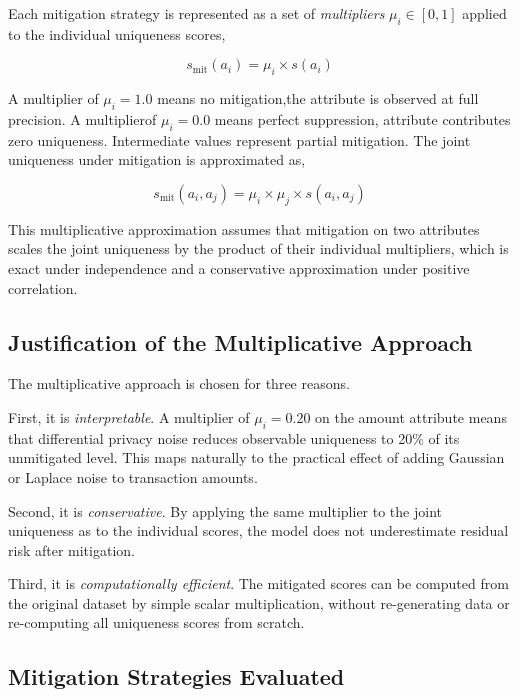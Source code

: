 Each mitigation strategy is represented as a set of
\textit{multipliers} $\mu_i \in [0, 1]$ applied to the
individual uniqueness scores,

\begin{equation}
s_{\mathrm{mit}}(a_i) = \mu_i \times s(a_i)
\label{eq:mitigation}
\end{equation}

A multiplier of $\mu_i = 1.0$ means no mitigation,the attribute is observed at full precision. A multiplierof $\mu_i = 0.0$ means perfect suppression,
attribute contributes zero uniqueness. Intermediate values
represent partial mitigation. The joint uniqueness under
mitigation is approximated as,

\begin{equation}
s_{\mathrm{mit}}(a_i, a_j)
= \mu_i \times \mu_j \times s(a_i, a_j)
\label{eq:mit_joint}
\end{equation}

This multiplicative approximation assumes that mitigation
on two attributes scales the joint uniqueness by the
product of their individual multipliers, which is exact
under independence and a conservative approximation
under positive correlation.

\subsection{Justification of the Multiplicative Approach}

The multiplicative approach is chosen for three reasons.

First, it is \textit{interpretable}. A multiplier of
$\mu_i = 0.20$ on the amount attribute means that
differential privacy noise reduces observable uniqueness
to 20\% of its unmitigated level. This maps naturally
to the practical effect of adding Gaussian or Laplace
noise to transaction amounts.

Second, it is \textit{conservative}. By applying the
same multiplier to the joint uniqueness as to the
individual scores, the model does not underestimate
residual risk after mitigation.

Third, it is \textit{computationally efficient}. The
mitigated scores can be computed from the original
dataset by simple scalar multiplication, without
re-generating data or re-computing all uniqueness
scores from scratch.

\subsection{Mitigation Strategies Evaluated}

